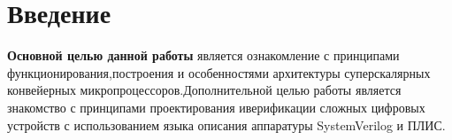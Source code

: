 \chapter*{Введение}

\textbf{Основной целью данной работы} является ознакомление с принципами функционирования,построения и особенностями архитектуры суперскалярных конвейерных микропроцессоров.Дополнительной целью работы является знакомство с принципами проектирования иверификации сложных цифровых устройств с использованием языка описания аппаратуры SystemVerilog и ПЛИС.

